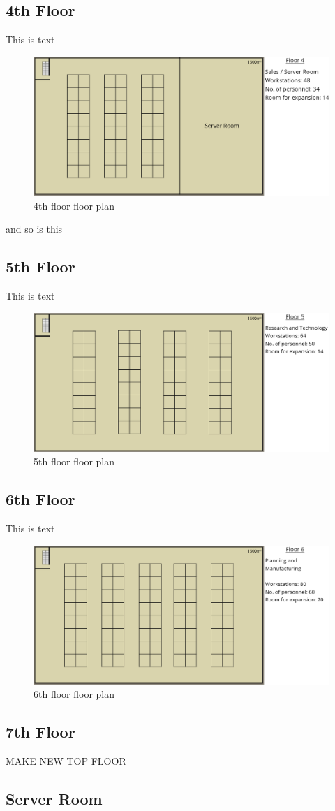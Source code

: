 \subsection{4th Floor}
This is text
\begin{figure}[ht!]
    \includegraphics[width=15cm]{Figures/4th-Floor.png}
    \caption{4th floor floor plan}
    \label{4th_floor}
\end{figure}
and so is this
\subsection{5th Floor}
This is text
\begin{figure}[ht!]
    \includegraphics[width=15cm]{Figures/5th-Floor.png}
    \caption{5th floor floor plan}
    \label{5th_floor}
\end{figure}
\subsection{6th Floor}
This is text
\begin{figure}[ht!]
    \includegraphics[width=15cm]{Figures/6th-Floor.png}
    \caption{6th floor floor plan}
    \label{6th_floor}
\end{figure}
\subsection{7th Floor}
\begin{huge}
    MAKE NEW TOP FLOOR
\end{huge}
\subsection{Server Room}